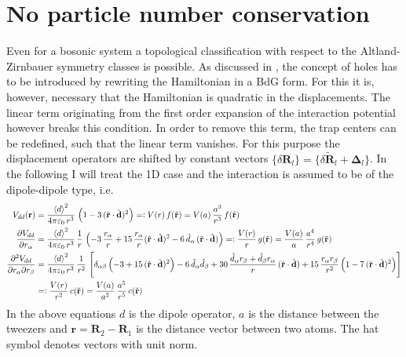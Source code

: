 \section{No particle number conservation}
Even for a bosonic system a topological classification with respect to the Altland-Zirnbauer symmetry classes is possible. As discussed in , the concept of holes has to be introduced by rewriting the Hamiltonian in a BdG form. For this it is, however, necessary  that the Hamiltonian is quadratic in the displacements. The linear term originating from the first order expansion of the interaction potential however breaks this condition. In order to remove this term, the trap centers can be redefined, such that the linear term vanishes. For this purpose the displacement operators are shifted by constant vectors $\{\delta\mathbf{R}_l\}=\{\delta\tilde{\mathbf{R}}_l+\mathbf{\Delta}_l\}$. 
In the following I will treat the 1D case and the interaction is assumed to be of the dipole-dipole type, i.e.
\begin{align}\label{eq:dipole interaction}
    V_{dd}(\mathbf{r}) &= \frac{\expval{d}^2}{4\pi\varepsilon_0\,r^3}\,\left(1-3\,(\hat{\mathbf{r}}\cdot \hat{\mathbf{d}})^2\right)=\vcentcolon V(r)\,f(\hat{\mathbf{r}})=V(a)\,\frac{a^3}{r^3}\,f(\hat{\mathbf{r}})\\
    \frac{\partial V_{dd}}{\partial r_\alpha} &=\frac{\expval{d}^2}{4\pi\varepsilon_0\,r^3}\,\frac1r\,\left( -3\,\frac{ r_\alpha}{r} + 15\,\frac{ r_\alpha }{r}(\hat{\mathbf{r}}\cdot \hat{\mathbf{d}})^2 - 6\,\hat{d}_\alpha\, (\hat{\mathbf{r}}\cdot \hat{\mathbf{d}}) \right)=\vcentcolon \frac{V(r)}{r}\,g(\hat{\mathbf{r}})=\frac{V(a)}{a}\,\frac{a^4}{r^4}\,g(\hat{\mathbf{r}})\\
    \frac{\partial^2 V_{dd}}{\partial r_\alpha \partial r_\beta}  &= \frac{\expval{d}^2}{4\pi\varepsilon_0\,r^3}\,\frac1{r^2}\,\left[\delta_{\alpha\beta}\left(-3 + 15\, (\hat{\mathbf{r}}\cdot \hat{\mathbf{d}})^2\right)- 6\,\hat{d}_\alpha \hat{d}_\beta +30\, \frac{\hat{d}_\alpha r_\beta + \hat{d}_\beta r_\alpha}{r}\,(\hat{\mathbf{r}}\cdot \hat{\mathbf{d}}) + 15\,\frac{r_\alpha r_\beta}{r^2} \left(1  - 7\, (\hat{\mathbf{r}}\cdot \hat{\mathbf{d}})^2\right)\right]\notag\\
    &=\vcentcolon \frac{V(r)}{r^2}\,c(\hat{\mathbf{r}})=\frac{V(a)}{a^2}\,\frac{a^5}{r^5}\,c(\hat{\mathbf{r}})
\end{align}
In the above equations $d$ is the dipole operator, $a$ is the distance between the tweezers and $\mathbf{r}=\mathbf{R}_2-\mathbf{R}_1$ is the distance vector between two atoms. The hat symbol denotes vectors with unit norm. 
